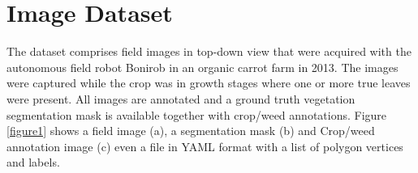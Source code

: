 \documentclass[12pt]{article}
\numberwithin{equation}{section}
\numberwithin{table}{section}
\numberwithin{figure}{section}
\begin{document}
%
%




%
%
%



\section{Image Dataset}

The dataset comprises field images in top-down view that were acquired with the autonomous field robot Bonirob\cite{BOSH} in an organic carrot farm in 2013. The images were captured while the crop was in growth stages where one or more true leaves were present. All images are annotated and a ground truth vegetation segmentation mask is available together with crop/weed annotations. Figure \ref{figure1} shows a field image (a), a segmentation mask (b) and Crop/weed annotation image (c) even a file in YAML format with a list of polygon vertices and labels.
\end{document}
